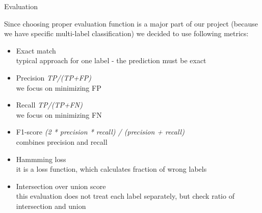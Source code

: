 \documentclass{beamer}
\begin{document}
\begin{frame}[t]{Evaluation}

\vspace{-3mm}

Since choosing proper evaluation function is a major part of our project (because we have specific multi-label classification) we decided to use following metrics:
	
\begin{itemize}
	
\pause
\item Exact match \\
typical approach for one label - the prediction must be exact
	
\pause
\item Precision {\it TP/(TP+FP)} \\
we focus on minimizing FP

\pause
\item Recall {\it TP/(TP+FN)} \\
we focus on minimizing FN

\pause
\item F1-score {\it (2 * precision * recall) / (precision + recall)} \\
combines precision and recall

\pause
\item Hammming loss \\
it is a loss function, which calculates fraction of wrong labels

\pause
\item Intersection over union score \\
this evaluation does not treat each label separately, but check ratio of intersection and union
\end{itemize}
\end{frame}
\end{document}
